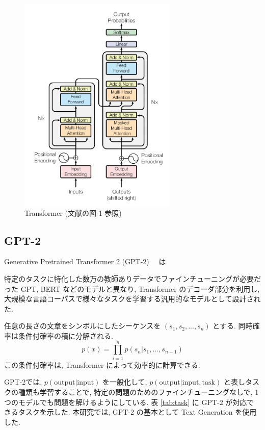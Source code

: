 \documentclass[twocolumn]{jarticle}     %
\begin{document}
\begin{figure}[tb]
  \begin{center}
    \includegraphics[clip,width=75mm]{Transformer.png}
    \caption{Transformer (文献\cite{DBLP:journals/corr/VaswaniSPUJGKP17}の図 1 参照)}
    \label{fig:trans}
  \end{center}
\end{figure}



\subsection{GPT-2}
Generative Pretrained Transformer 2 (GPT-2) \cite{radford2019language}　は

特定のタスクに特化した数万の教師ありデータでファインチューニングが必要だった GPT, BERT などのモデルと異なり,
Transformer のデコーダ部分を利用し,
大規模な言語コーパスで様々なタスクを学習する汎用的なモデルとして設計された.

任意の長さの文章をシンボルにしたシーケンスを $(s_1, s_2, ..., s_n)$ とする.
同時確率は条件付確率の積に分解される.
\begin{equation}
p(x) = \prod^n_{i=1} p(s_n|s_1, ... , s_{n-1})
\end{equation}
この条件付確率は, Transformer によって効率的に計算できる.

GPT-2では, $p(\mathrm{output} | \mathrm{input})$ を一般化して,
$p(\mathrm{output} | \mathrm{input}, \mathrm{task})$ と表しタスクの種類も学習することで, 特定の問題のためのファインチューニングなしで, 1 つのモデルでも問題を解けるようにしている.
表 \ref{tab:task} に GPT-2 が対応できるタスクを示した.
本研究では, GPT-2 の基本として Text Generation を使用した.
\end{document}
